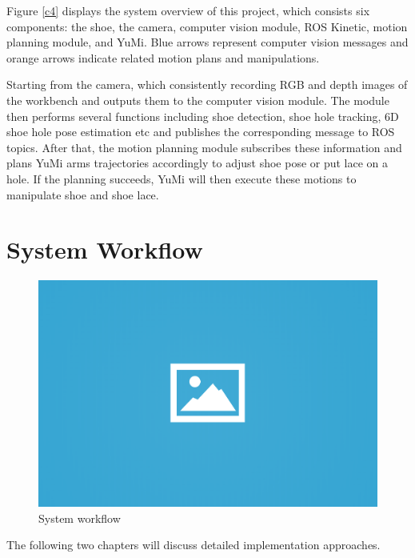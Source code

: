 Figure \ref{c4} displays the system overview of this project, which consists six components: the shoe, the camera, computer vision module, ROS Kinetic, motion planning module, and YuMi. Blue arrows represent computer vision messages and orange arrows indicate related motion plans and manipulations.

Starting from the camera, which consistently recording RGB and depth images of the workbench and outputs them to the computer vision module. The module then performs several functions including shoe detection, shoe hole tracking, 6D shoe hole pose estimation etc and publishes the corresponding message to ROS topics. After that, the motion planning module subscribes these information and plans YuMi arms trajectories accordingly to adjust shoe pose or put lace on a hole. If the planning succeeds, YuMi will then execute these motions to manipulate shoe and shoe lace.

\section{System Workflow}

\begin{figure}[H]
\centering
\includegraphics[width = 0.5\columnwidth]{images/ph.png}
\caption{System workflow}
\label{workflow}
\end{figure}

The following two chapters will discuss detailed implementation approaches.
